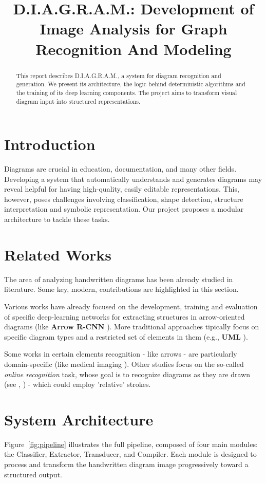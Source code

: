\documentclass[conference]{IEEEtran}
\title{D.I.A.G.R.A.M.: Development of Image Analysis for Graph Recognition And Modeling}
\author{
    \IEEEauthorblockN{Filippo Garagnani, Saverio Napolitano, Nicola Ricciardi}
    \IEEEauthorblockA{
        'Computer Vision and Cognitive System' course \\
        \textit{Università di Modena e Reggio Emilia}
    }
}
\begin{document}
\maketitle

\begin{abstract}
This report describes D.I.A.G.R.A.M., a system for diagram recognition and generation. We present its architecture, the logic behind deterministic algorithms and the training of its deep learning components. The project aims to transform visual diagram input into structured representations.
\end{abstract}

\section{Introduction}
Diagrams are crucial in education, documentation, and many other fields. Developing a system that automatically understands and generates diagrams may reveal helpful for having high-quality, easily editable representations. This, however, poses challenges involving classification, shape detection, structure interpretation and symbolic representation. Our project proposes a modular architecture to tackle these tasks.

\section{Related Works}
The area of analyzing handwritten diagrams has been already studied in literature. Some key, modern, contributions are highlighted in this section.

Various works have already focused on the development, training and evaluation of specific deep-learning networks for extracting structures in arrow-oriented diagrams (like \textbf{Arrow R-CNN} \cite{arrowrcnn}). More traditional approaches tipically focus on specific diagram types and a restricted set of elements in them (e.g., \textbf{UML} \cite{interactiveUML}). 

Some works in certain elements recognition - like arrows - are particularly domain-specific (like medical imaging \cite{med1}\cite{med2}). Other studies focus on the so-called \textit{online recognition} task, whose goal is to recognize diagrams as they are drawn (see \cite{online1}, \cite{online2}) - which could employ 'relative' strokes.
\cite{sketchdiagram}

\section{System Architecture}
Figure~\ref{fig:pipeline} illustrates the full pipeline, composed of four main modules: the Classifier, Extractor, Transducer, and Compiler. Each module is designed to process and transform the handwritten diagram image progressively toward a structured output.
\end{document}
